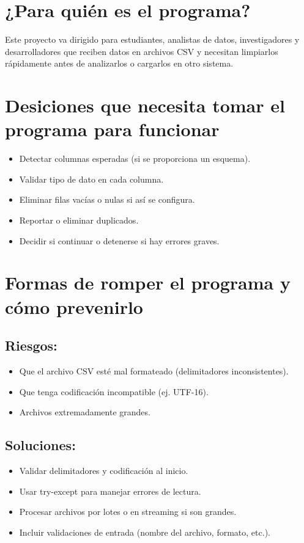 \documentclass[10pt]{article}
\begin{document}
\section*{¿Para quién es el programa?}

Este proyecto va dirigido para estudiantes, analistas de datos, investigadores y desarrolladores que reciben datos en archivos CSV y necesitan limpiarlos rápidamente antes de analizarlos o cargarlos en otro sistema.

\section*{Desiciones que necesita tomar el programa para funcionar}

\begin{itemize}
    \item Detectar columnas esperadas (si se proporciona un esquema).
    \item Validar tipo de dato en cada columna.
    \item Eliminar filas vacías o nulas si así se configura.
    \item Reportar o eliminar duplicados.
    \item Decidir si continuar o detenerse si hay errores graves.
\end{itemize}

\section*{Formas de romper el programa y cómo prevenirlo}
\subsection*{Riesgos:}
\begin{itemize}
    \item Que el archivo CSV esté mal formateado (delimitadores inconsistentes).
    \item Que tenga codificación incompatible (ej. UTF-16).
    \item Archivos extremadamente grandes.
\end{itemize}

\subsection*{Soluciones:}
\begin{itemize}
    \item Validar delimitadores y codificación al inicio.
    \item Usar try-except para manejar errores de lectura.
    \item Procesar archivos por lotes o en streaming si son grandes.
    \item Incluir validaciones de entrada (nombre del archivo, formato, etc.).
\end{itemize}
\end{document}
